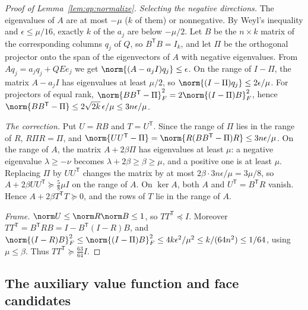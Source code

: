\begin{proof}[Proof of Lemma~\ref{lem:qp:normalize}]
\emph{Selecting the negative directions.} The eigenvalues of $A$ are at most
$-\mu$ ($k$ of them) or nonnegative. By Weyl's inequality and
$\epsilon\le\mu/16$, exactly $k$ of the $a_j$ are below $-\mu/2$. Let $B$ be
the $n\times k$ matrix of the corresponding columns $q_j$ of $Q$, so
$B^{\mathsf T} B=I_k$, and let $\Pi$ be the orthogonal projector onto the span of the
eigenvectors of $A$ with negative eigenvalues. From $Aq_j=a_jq_j+QEe_j$ we get
$\norm{(A-a_jI)q_j}\le\epsilon$. On the range of $I-\Pi$, the matrix
$A-a_jI$ has eigenvalues at least $\mu/2$, so
$\norm{(I-\Pi)q_j}\le2\epsilon/\mu$. For projectors of equal rank,
$\norm{BB^{\mathsf T}-\Pi}_F^2=2\norm{(I-\Pi)B}_F^2$, hence
$\norm{BB^{\mathsf T}-\Pi}\le2\sqrt{2k}\,\epsilon/\mu\le3n\epsilon/\mu$.

\emph{The correction.} Put $U=RB$ and $T=U^{\mathsf T}$. Since the range of $\Pi$ lies
in the range of $R$, $R\Pi R=\Pi$, and
$\norm{UU^{\mathsf T}-\Pi}=\norm{R(BB^{\mathsf T}-\Pi)R}\le3n\epsilon/\mu$. On the range of
$A$, the matrix $A+2\beta\Pi$ has eigenvalues at least $\mu$: a negative
eigenvalue $\lambda\ge-\nu$ becomes $\lambda+2\beta\ge\beta\ge\mu$, and a
positive one is at least $\mu$. Replacing $\Pi$ by $UU^{\mathsf T}$ changes the
matrix by at most $2\beta\cdot3n\epsilon/\mu=3\mu/8$, so
$A+2\beta UU^{\mathsf T}\succeq\frac58\mu I$ on the range of $A$. On $\ker A$, both
$A$ and $U^{\mathsf T}=B^{\mathsf T} R$ vanish. Hence $A+2\beta T^{\mathsf T} T\succeq0$, and the
rows of $T$ lie in the range of $A$.

\emph{Frame.} $\norm U\le\norm R\norm B\le1$, so $TT^{\mathsf T}\preceq I$. Moreover
$TT^{\mathsf T}=B^{\mathsf T} RB=I-B^{\mathsf T}(I-R)B$, and
$\norm{(I-R)B}_F^2\le\norm{(I-\Pi)B}_F^2\le4k\epsilon^2/\mu^2\le k/(64n^2)\le1/64$,
using $\mu\le\beta$. Thus $TT^{\mathsf T}\succeq\frac{63}{64}I$.
\end{proof}

\subsection{The auxiliary value function and face candidates}

